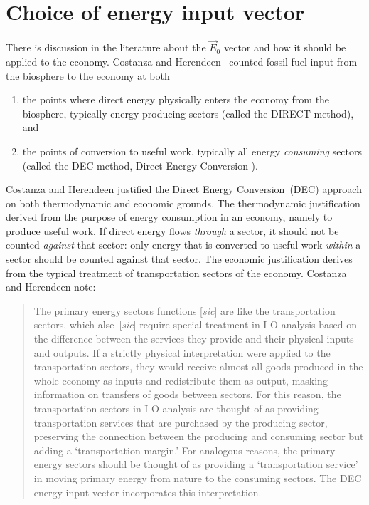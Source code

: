 \section{Choice of energy input vector}
\label{sec:energy_input_vector}


There is discussion in the literature about the $\vec{E}_{0}$
vector and how it should be applied to the economy.
Costanza and Herendeen~\cite{Costanza:1984tq} counted fossil fuel input 
from the biosphere to the economy
at both 

\begin{enumerate}
	\item the points where direct energy physically 
		enters the economy from the biosphere, 
		typically energy-producing sectors
		(called the DIRECT method), and
	\item the points of conversion to useful work, 
		typically all energy \emph{consuming} sectors
		(called the DEC method, 
		Direct Energy Conversion	).
\end{enumerate}

Costanza and Herendeen justified the Direct Energy Conversion~(DEC) 
approach on both thermodynamic and economic grounds. 
The thermodynamic justification derived from the purpose 
of energy consumption in an economy, 
namely to produce useful work. 
If direct energy flows \emph{through} a sector, 
it should not be counted \emph{against} that sector: 
only energy that is converted to useful work \emph{within} 
a sector should be counted against that sector.
The economic justification derives 
from the typical treatment of transportation sectors of the economy.
Costanza and Herendeen note:

\begin{quote}
	The primary energy sectors functions [\emph{sic}] \sout{are}
	like the transportation sectors, 
	which alse~[\emph{sic}] require special treatment in I-O analysis 
	based on the difference between the services they provide 
	and their physical inputs and outputs. 
	If a strictly physical interpretation were applied to the 
	transportation sectors, 
	they would receive almost all goods produced in the whole economy as inputs 
	and redistribute them as output, 
	masking information on transfers of goods between sectors. 
	For this reason, the transportation sectors in I-O analysis 
	are thought of as providing transportation services 
	that are purchased by the producing sector, 
	preserving the connection between the producing and consuming sector 
	but adding a `transportation margin.' 
	For analogous reasons, 
	the primary energy sectors should be thought of as providing a 
	`transportation service' in moving primary energy 
	from nature to the consuming sectors. 
	The DEC energy input vector incorporates this interpretation.\cite[p. 151]{Costanza:1984tq}
\end{quote}


